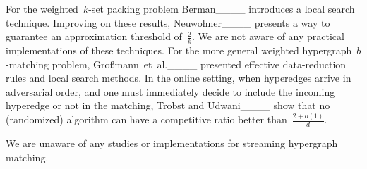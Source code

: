 For the weighted~$k$-set packing problem Berman____ introduces a local search technique.
Improving on these results, Neuwohner____ presents a way to guarantee an approximation threshold of~$\frac{2}{k}$. We are not aware of any practical implementations of these techniques.
For the more general weighted hypergraph~$b$-matching problem, 
Großmann~et~al.____ presented effective data-reduction rules and local search methods.
In the online setting, when hyperedges arrive in adversarial order, and one must  immediately decide to include the incoming hyperedge or not in the matching, Trobst and Udwani____ show that no (randomized) algorithm can have a competitive ratio better than~$\frac{2+o(1)}{d}$.

We are unaware of any studies or implementations for streaming hypergraph matching.